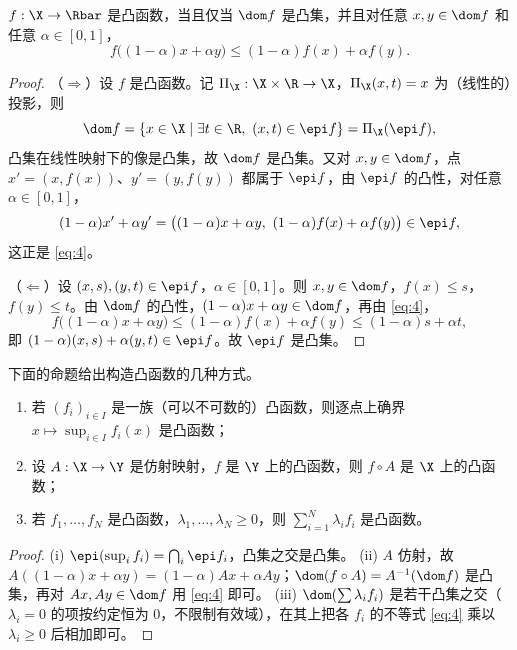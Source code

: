 \begin{proposition}
\label{res:15}
$f:\X\to\Rbar$ 是凸函数，当且仅当 $\dom f$ 是凸集，并且对任意 $x,y\in\dom f$ 和任意 $\alpha\in[0,1]$，
\begin{equation}
  \label{eq:4}
  f\bigl((1-\alpha)x+\alpha y\bigr)\leqslant(1-\alpha)f(x)+\alpha f(y).
\end{equation}
\end{proposition}

\begin{proof}
（$\Rightarrow$）设 $f$ 是凸函数。记 $\Pi_\X:\X\times\R\to\X$，$\Pi_\X(x,t)=x$ 为（线性的）投影，则
\[
  \dom f = \{x\in\X \mid \exists t\in\R,\ (x,t)\in\epi f\} = \Pi_\X(\epi f),
\]
凸集在线性映射下的像是凸集，故 $\dom f$ 是凸集。又对 $x,y\in\dom f$，点 $x'=(x,f(x))$、$y'=(y,f(y))$ 都属于 $\epi f$，由 $\epi f$ 的凸性，对任意 $\alpha\in[0,1]$，
\[
  (1-\alpha)x'+\alpha y' = \bigl((1-\alpha)x+\alpha y,\ (1-\alpha)f(x)+\alpha f(y)\bigr)\in\epi f,
\]
这正是 \eqref{eq:4}。

（$\Leftarrow$）设 $(x,s),(y,t)\in\epi f$，$\alpha\in[0,1]$。则 $x,y\in\dom f$，$f(x)\leqslant s$，$f(y)\leqslant t$。由 $\dom f$ 的凸性，$(1-\alpha)x+\alpha y\in\dom f$，再由 \eqref{eq:4}，
\[
  f\bigl((1-\alpha)x+\alpha y\bigr)\leqslant(1-\alpha)f(x)+\alpha f(y)\leqslant(1-\alpha)s+\alpha t,
\]
即 $(1-\alpha)(x,s)+\alpha(y,t)\in\epi f$。故 $\epi f$ 是凸集。
\end{proof}

下面的命题给出构造凸函数的几种方式。

\begin{proposition}
\label{res:16}
\begin{enumerate}[label=(\roman*)]
  \item 若 $(f_i)_{i\in I}$ 是一族（可以不可数的）凸函数，则逐点上确界 $x\mapsto\sup_{i\in I}f_i(x)$ 是凸函数；
  \item 设 $A:\X\to\Y$ 是仿射映射，$f$ 是 $\Y$ 上的凸函数，则 $f\circ A$ 是 $\X$ 上的凸函数；
  \item 若 $f_1,\dots,f_N$ 是凸函数，$\lambda_1,\dots,\lambda_N\geqslant0$，则 $\sum_{i=1}^N\lambda_if_i$ 是凸函数。
\end{enumerate}
\end{proposition}

\begin{proof}
(i) $\epi(\sup_i f_i)=\bigcap_i\epi f_i$，凸集之交是凸集。
(ii) $A$ 仿射，故 $A((1-\alpha)x+\alpha y)=(1-\alpha)Ax+\alpha Ay$；$\dom(f\circ A)=A^{-1}(\dom f)$ 是凸集，再对 $Ax,Ay\in\dom f$ 用 \eqref{eq:4} 即可。
(iii) $\dom(\sum\lambda_if_i)$ 是若干凸集之交（$\lambda_i=0$ 的项按约定恒为 $0$，不限制有效域），在其上把各 $f_i$ 的不等式 \eqref{eq:4} 乘以 $\lambda_i\geqslant0$ 后相加即可。
\end{proof}


